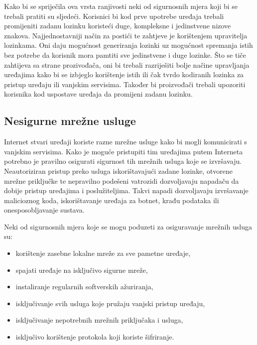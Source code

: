 \documentclass[times, utf8, diplomski]{fer}
\begin{document}
Kako bi se spriječila ova vrsta ranjivosti neki od sigurnosnih mjera koji bi se trebali pratiti su sljedeći. Korisnici bi kod prve upotrebe uređaja trebali promijeniti zadanu lozinku koristeći duge, kompleksne i jedinstvene nizove znakova. Najjednostavniji način za postići te zahtjeve je korištenjem upravitelja lozinkama. Oni daju mogućnost generiranja lozinki uz mogućnost spremanja istih bez potrebe da korisnik mora pamtiti sve jedinstvene i duge lozinke. Što se tiče zahtijeva sa strane prozivođača, oni bi trebali razriješiti bolje načine upravljanja uređajima kako bi se izbjeglo korištenje istih ili čak tvrdo kodiranih lozinka za pristup uređaju ili vanjskim servisima. Također bi proizvođači trebali upozoriti korisnika kod uspostave uređaja da promijeni zadanu lozinku.

\subsection{Nesigurne mrežne usluge}
Internet stvari uređaji koriste razne mrežne usluge kako bi mogli komunicirati s vanjskim servisima. Kako je moguće pristupiti tim uređajima putem Interneta potrebno je pravilno osigurati sigurnost tih mrežnih usluga koje se izvršavaju. Neautoriziran pristup preko usluga iskorištavajući zadane lozinke, otvorene mrežne priključke te nepravilno podešeni vatrozidi dozvoljavaju napadaču da dobije pristup uređajima i poslužiteljima. Takvi napadi dozvoljavaju izvršavanje malicioznog koda, iskorištavanje uređaja za botnet, krađu podataka ili onesposobljavanje sustava.

Neki od sigurnosnih mjera koje se mogu poduzeti za osiguravanje mrežnih usluga su: \begin{itemize}
    \item korištenje zasebne lokalne mreže za sve pametne uređaje,
    \item spajati uređaje na isključivo sigurne mreže,
    \item instaliranje regularnih softverskih ažuriranja,
    \item isključivanje svih usluga koje pružaju vanjski pristup uređaju,
    \item isključivanje nepotrebnih mrežnih priključaka i usluga,
    \item isključivo korištenje protokola koji koriste šifriranje.
\end{itemize}
\end{document}
